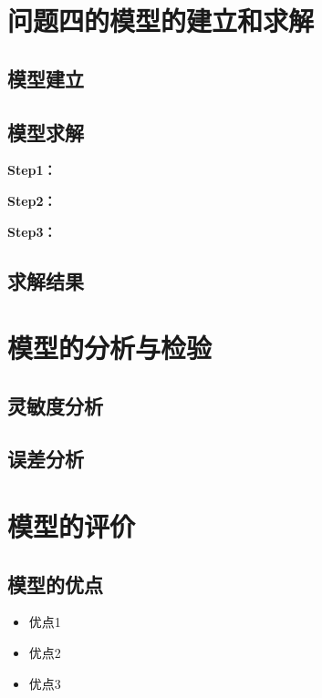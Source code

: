 \documentclass{cumcmthesis}
\begin{document}

\section{问题四的模型的建立和求解}
\subsection{模型建立}

\subsection{模型求解}

\textbf{Step1：} 

\textbf{Step2：} 

\textbf{Step3：} 

\subsection{求解结果}


\section{模型的分析与检验}

\subsection{灵敏度分析}

\subsection{误差分析}


\section{模型的评价}

\subsection{模型的优点}
\begin{itemize}[itemindent=2em]
\item 优点1
\item 优点2
\item 优点3
\end{itemize}
\end{document}

